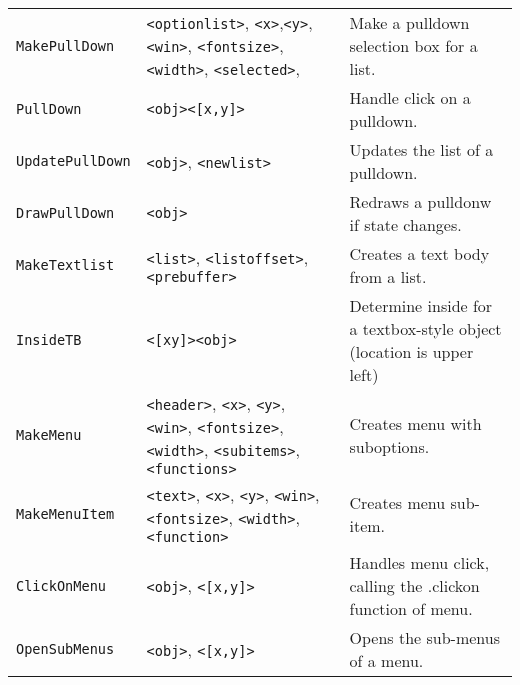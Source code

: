 \begin{longtable}{p{3cm}p{3cm}p{6cm}}
\verb+MakePullDown+&\verb+<optionlist>+, \verb+<x>+,\verb+<y>+, \verb+<win>+, \verb+<fontsize>+, \verb+<width>+, \verb+<selected>+, &Make a pulldown selection box for a list.\\
\verb+PullDown+&\verb+<obj>+\verb+<[x,y]>+ &Handle click on a pulldown.\\
\verb+UpdatePullDown+&\verb+<obj>+, \verb+<newlist>+ &Updates the list of a pulldown.\\
\verb+DrawPullDown+&\verb+<obj>+ &Redraws a pulldonw if state changes.\\


\verb+MakeTextlist+&\verb+<list>+, \verb+<listoffset>+,
  \verb+<prebuffer>+&Creates a text body from a list.\\ 
\verb+InsideTB+&\verb+<[xy]>+\verb+<obj>+&Determine inside for a textbox-style object (location is upper left)\\


\verb+MakeMenu+&\verb+<header>+, \verb+<x>+, \verb+<y>+, \verb+<win>+, \verb+<fontsize>+, \verb+<width>+, \verb+<subitems>+, \verb+<functions>+
&Creates menu with suboptions.\\ 

\verb+MakeMenuItem+&\verb+<text>+, \verb+<x>+, \verb+<y>+, \verb+<win>+, \verb+<fontsize>+, \verb+<width>+, \verb+<function>+
&Creates menu sub-item.\\ 
\verb+ClickOnMenu+&\verb+<obj>+, \verb+<[x,y]>+ & Handles menu click, calling the .clickon function of menu.\\

\verb+OpenSubMenus+&\verb+<obj>+, \verb+<[x,y]>+&Opens the sub-menus of a menu.\\


\end{longtable}
